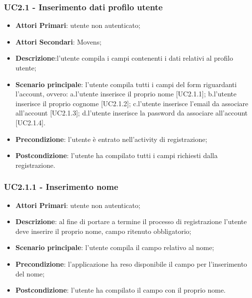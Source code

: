 \subsubsection{UC2.1 - Inserimento dati profilo utente}
\begin{itemize}
	\item \textbf{Attori Primari}: utente non autenticato;
	\item \textbf{Attori Secondari}: Movens\glo;
	\item \textbf{Descrizione}:l'utente compila i campi contenenti i dati relativi al profilo utente;
	\item \textbf{Scenario principale}: l'utente compila tutti i campi del form riguardanti l'account, ovvero:
	a.l'utente inserisce il proprio nome [UC2.1.1];
	\newline
	b.l'utente inserisce il proprio cognome [UC2.1.2];
	\newline
	c.l'utente inserisce l'email da associare all'account [UC2.1.3];
	\newline
	d.l'utente inserisce la password da associare all'account [UC2.1.4].
	\item \textbf{Precondizione}: l'utente è entrato nell'activity di registrazione;
	\item \textbf{Postcondizione}: l'utente ha compilato tutti i campi richiesti dalla registrazione.
	
\end{itemize}
\subsubsection{UC2.1.1 - Inserimento nome}
\begin{itemize}
	\item \textbf{Attori Primari}: utente non autenticato;
	\item \textbf{Descrizione}: al fine di portare a termine il processo di registrazione l'utente deve inserire il proprio nome, campo ritenuto obbligatorio;
	\item \textbf{Scenario principale}: l'utente compila il campo relativo al nome;	
	\item \textbf{Precondizione}: l'applicazione ha reso disponibile il campo per l'inserimento del nome;
	\item \textbf{Postcondizione}: l'utente ha compilato il campo con il proprio nome.	
\end{itemize}
